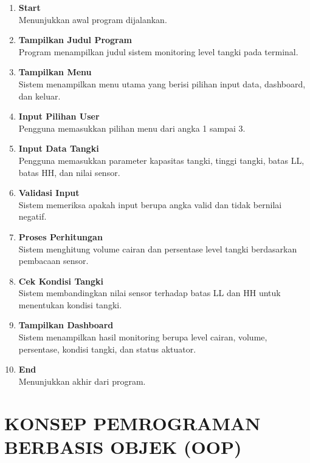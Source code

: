 \documentclass[12pt,a4paper]{article}
\begin{document}
\begin{enumerate}
    \item \textbf{Start} \\
    Menunjukkan awal program dijalankan.

    \item \textbf{Tampilkan Judul Program} \\
    Program menampilkan judul sistem monitoring level tangki pada terminal.

    \item \textbf{Tampilkan Menu} \\
    Sistem menampilkan menu utama yang berisi pilihan input data, dashboard, dan keluar.

    \item \textbf{Input Pilihan User} \\
    Pengguna memasukkan pilihan menu dari angka 1 sampai 3.

    \item \textbf{Input Data Tangki} \\
    Pengguna memasukkan parameter kapasitas tangki, tinggi tangki, batas LL, batas HH, dan nilai sensor.

    \item \textbf{Validasi Input} \\
    Sistem memeriksa apakah input berupa angka valid dan tidak bernilai negatif.

    \item \textbf{Proses Perhitungan} \\
    Sistem menghitung volume cairan dan persentase level tangki berdasarkan pembacaan sensor.

    \item \textbf{Cek Kondisi Tangki} \\
    Sistem membandingkan nilai sensor terhadap batas LL dan HH untuk menentukan kondisi tangki.

    \item \textbf{Tampilkan Dashboard} \\
    Sistem menampilkan hasil monitoring berupa level cairan, volume, persentase, kondisi tangki, dan status aktuator.

    \item \textbf{End} \\
    Menunjukkan akhir dari program.
\end{enumerate}

\section{KONSEP PEMROGRAMAN BERBASIS OBJEK (OOP)}
\end{document}

